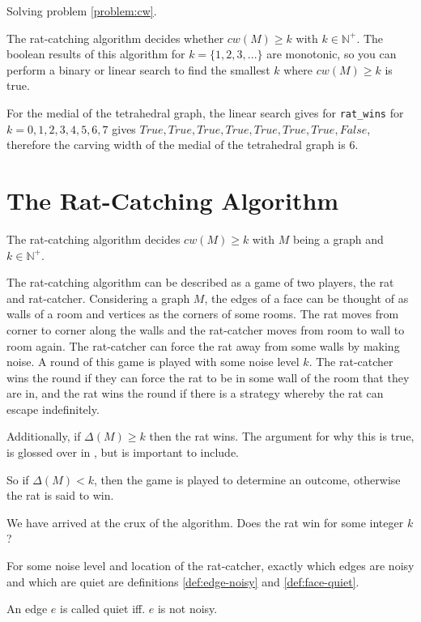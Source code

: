 \documentclass{article}
\begin{document}
			Solving problem \ref{problem:cw}.

			The rat-catching algorithm decides whether $cw(M) \geq k$ with $k \in \mathbb{N}^+$. The boolean results of this algorithm for $k=\{1,2,3,...\}$ are monotonic, so you can perform a binary or linear search to find the smallest $k$ where $cw(M) \geq k$ is true.


			For the medial of the tetrahedral graph, the linear search gives for \texttt{rat_wins} for $k=0,1,2,3,4,5,6,7$ gives $True, True, True, True, True, True, True, False$, therefore the carving width of the medial of the tetrahedral graph is $6$.

	\section{The Rat-Catching Algorithm}

		The rat-catching algorithm decides $cw(M) \geq k$ with $M$ being a graph and $k \in \mathbb{N}^+$.

		The rat-catching algorithm can be described as a game of two players, the rat and rat-catcher. Considering a graph $M$, the edges of a face can be thought of as walls of a room and vertices as the corners of some rooms. The rat moves from corner to corner along the walls and the rat-catcher moves from room to wall to room again. The rat-catcher can force the rat away from some walls by making noise. A round of this game is played with some noise level $k$. The rat-catcher wins the round if they can force the rat to be in some wall of the room that they are in, and the rat wins the round if there is a strategy whereby the rat can escape indefinitely.

		Additionally, if $\Delta(M) \geq k$ then the rat wins. The argument for why this is true, is glossed over in \cite{BGZ15}, but is important to include.

		So if $\Delta(M) < k$, then the game is played to determine an outcome, otherwise the rat is said to win.

		We have arrived at the crux of the algorithm. Does the rat win for some integer $k$?

		For some noise level and location of the rat-catcher, exactly which edges are noisy and which are quiet are definitions \ref{def:edge-noisy} and \ref{def:face-quiet}.

		An edge $e$ is called quiet iff. $e$ is not noisy.
\end{document}
